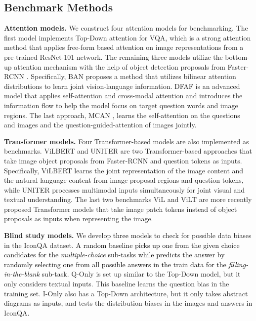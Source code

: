 \documentclass{article}
\begin{document}
\subsection{Benchmark Methods}


\textbf{Attention models.} We construct four attention models for benchmarking. The first model implements Top-Down attention \cite{Anderson2017up} for VQA, which is a strong attention method  that applies free-form based attention on image representations from a pre-trained ResNet-101 network. The remaining three models utilize the bottom-up attention mechanism with the help of object detection proposals from Faster-RCNN \cite{ren2015faster}. Specifically, BAN \cite{Kim2018} proposes a method that utilizes bilinear attention distributions to learn joint vision-language information. DFAF \cite{gao2019dynamic} is an advanced model that applies self-attention and cross-modal attention and introduces the information flow to help the model focus on target question words and image regions. The last approach, MCAN \cite{yu2019mcan}, learns the self-attention on the questions and images and the question-guided-attention of images jointly.

\textbf{Transformer models.} Four Transformer-based models are also implemented as benchmarks. ViLBERT \cite{lu2019vilbert} and UNITER \cite{chen2020uniter} are two Transformer-based approaches that take image object proposals from Faster-RCNN \cite{ren2015faster} and question tokens as inputs. Specifically, ViLBERT learns the joint representation of the image content and the natural language content from image proposal regions and question tokens, while UNITER processes multimodal inputs simultaneously for joint visual and textual understanding. The last two benchmarks ViL \cite{wonjae2021an} and ViLT \cite{pmlr-v139-kim21k} are more recently proposed Transformer models that take image patch tokens instead of object proposals as inputs when representing the image.

\textbf{Blind study models.} We develop \textcolor{black}{three} models to check for possible data biases in the IconQA dataset.  \textcolor{black}{A random baseline picks up one from the given choice candidates for the \textit{multiple-choice} sub-tasks while predicts the answer by randomly selecting one from all possible answers in the train data for the \textit{filling-in-the-blank} sub-task.}  Q-Only is set up similar to the Top-Down \cite{Anderson2017up} model, but it only considers textual inputs. This baseline learns the question bias in the training set. I-Only also has a Top-Down architecture, but it only takes abstract diagrams as inputs, and tests the distribution biases in the images and answers in IconQA. 
\end{document}
